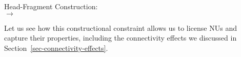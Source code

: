 \documentclass[output=paper
	        ,collection
	        ,collectionchapter
 	        ,biblatex
                ,babelshorthands
                ,newtxmath
                ,draftmode
                ,colorlinks, citecolor=brown
]{langscibook}
\begin{document}
{\ea
\label{hf-cx}
Head-Fragment Construction:\\
$\rightarrow$

\z
Let us see how this constructional constraint allows us to
license NUs and capture their properties, including the connectivity effects we discussed in Section~\ref{sec-connectivity-effects}.

}
\end{document}
